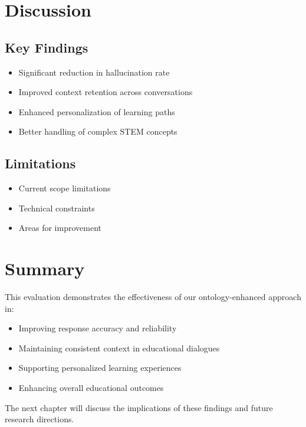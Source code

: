 \section{Discussion}
\label{sec:discussion}

\subsection{Key Findings}
\begin{itemize}
    \item Significant reduction in hallucination rate
    \item Improved context retention across conversations
    \item Enhanced personalization of learning paths
    \item Better handling of complex STEM concepts
\end{itemize}

\subsection{Limitations}
\begin{itemize}
    \item Current scope limitations
    \item Technical constraints
    \item Areas for improvement
\end{itemize}

\section{Summary}
\label{sec:summary}

This evaluation demonstrates the effectiveness of our ontology-enhanced approach in:
\begin{itemize}
    \item Improving response accuracy and reliability
    \item Maintaining consistent context in educational dialogues
    \item Supporting personalized learning experiences
    \item Enhancing overall educational outcomes
\end{itemize}

The next chapter will discuss the implications of these findings and future research directions. 
